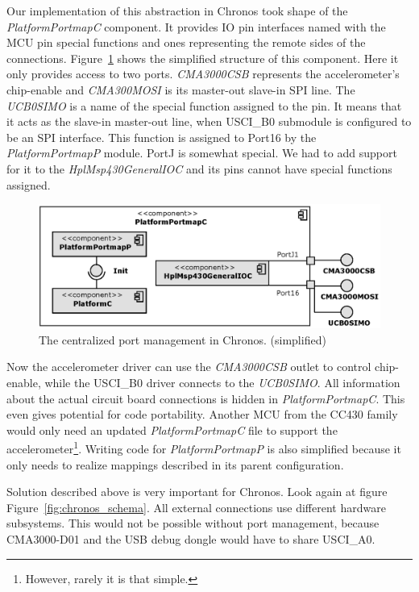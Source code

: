 Our implementation of this abstraction in Chronos took shape of the \emph{PlatformPortmapC} component. It provides IO pin interfaces named with the MCU pin special functions and ones representing the remote sides of the connections. Figure~\ref{fig:platform_portmap_c} shows the simplified structure of this component. Here it only provides access to two ports. \emph{CMA3000CSB} represents the accelerometer's chip-enable and \emph{CMA300MOSI} is its master-out slave-in SPI line. The \emph{UCB0SIMO} is a name of the special function assigned to the pin. It means that it acts as the slave-in master-out line, when USCI\_B0 submodule is configured to be an SPI interface. This function is assigned to Port16 by the \emph{PlatformPortmapP} module. PortJ is somewhat special. We had to add support for it to the  \emph{HplMsp430GeneralIOC} and its pins cannot have special functions assigned.

\begin{figure}[h]
  \centering
  \includegraphics{diagrams/platform_portmap_c.eps}
  \caption{The centralized port management in Chronos. (simplified)}
  \label{fig:platform_portmap_c}
\end{figure}

Now the accelerometer driver can use the \emph{CMA3000CSB} outlet to control chip-enable, while the USCI\_B0 driver connects to the \emph{UCB0SIMO}. All information about the actual circuit board connections is hidden in \emph{PlatformPortmapC}. This even gives potential for code portability. Another MCU from the CC430 family would only need an updated \emph{PlatformPortmapC} file to support the accelerometer\footnote{However, rarely it is that simple.}. Writing code for \emph{PlatformPortmapP} is also simplified because it only needs to realize mappings described in its parent configuration.

Solution described above is very important for Chronos. Look again at figure Figure~\ref{fig:chronos_schema}. All external connections use different hardware subsystems. This would not be possible without port management, because CMA3000-D01 and the USB debug dongle would have to share USCI\_A0.

